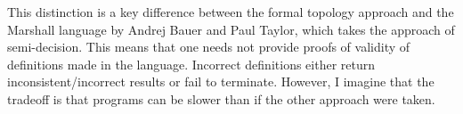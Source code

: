 This distinction is a key difference between the formal topology approach and the Marshall language by Andrej Bauer and Paul Taylor, which takes the approach of semi-decision. This means that one needs not provide proofs of validity of definitions made in the language. Incorrect definitions either return inconsistent/incorrect results or fail to terminate. However, I imagine that the tradeoff is that programs can be slower than if the other approach were taken.
